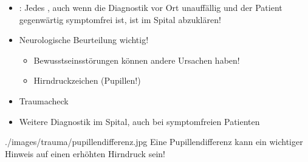 {\begin{itemize}
  \item {}: Jedes , auch wenn die
  Diagnostik vor Ort unauffällig und der Patient gegenwärtig
  symptomfrei ist, ist im Spital abzuklären!
\end{itemize}


}
{
\begin{itemize}
  \item Neurologische Beurteilung wichtig!
  \begin{itemize}
    \item Bewusstseinsstörungen können andere Ursachen
    haben!
    \item Hirndruckzeichen (Pupillen!)
  \end{itemize}
  \item Traumacheck
  \item Weitere Diagnostik im Spital, auch bei symptomfreien
  Patienten
  
\end{itemize}
}
{./images/trauma/pupillendifferenz.jpg}
{ Eine Pupillendifferenz kann ein
wichtiger Hinweis auf einen erhöhten Hirndruck sein!}
{}
{}



